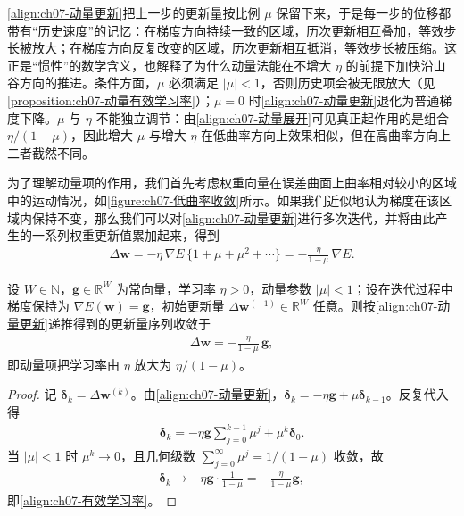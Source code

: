 \documentclass[../../main.tex]{subfiles}
\begin{document}
\begin{remark}
\eqref{align:ch07-动量更新}把上一步的更新量按比例 $\mu$ 保留下来，于是每一步的位移都带有“历史速度”的记忆：在梯度方向持续一致的区域，历次更新相互叠加，等效步长被放大；在梯度方向反复改变的区域，历次更新相互抵消，等效步长被压缩。这正是“惯性”的数学含义，也解释了为什么动量法能在不增大 $\eta$ 的前提下加快沿山谷方向的推进。条件方面，$\mu$ 必须满足 $|\mu|<1$，否则历史项会被无限放大（见\cref{proposition:ch07-动量有效学习率}）；$\mu=0$ 时\eqref{align:ch07-动量更新}退化为普通梯度下降。$\mu$ 与 $\eta$ 不能独立调节：由\eqref{align:ch07-动量展开}可见真正起作用的是组合 $\eta/(1-\mu)$，因此增大 $\mu$ 与增大 $\eta$ 在低曲率方向上效果相似，但在高曲率方向上二者截然不同。
\end{remark}

为了理解动量项的作用，我们首先考虑权重向量在误差曲面上曲率相对较小的区域中的运动情况，如\cref{figure:ch07-低曲率收敛}所示。如果我们近似地认为梯度在该区域内保持不变，那么我们可以对\eqref{align:ch07-动量更新}进行多次迭代，并将由此产生的一系列权重更新值累加起来，得到
\begin{align}
\Delta\mathbf{w} = -\eta\,\nabla E\,\{1+\mu+\mu^{2}+\cdots\} = -\frac{\eta}{1-\mu}\,\nabla E.
\label{align:ch07-动量展开}
\end{align}

\begin{proposition}[动量法的有效学习率]\label{proposition:ch07-动量有效学习率}
设 $W\in\mathbb{N}$，$\mathbf{g}\in\mathbb{R}^{W}$ 为常向量，学习率 $\eta>0$，动量参数 $|\mu|<1$；设在迭代过程中梯度保持为 $\nabla E(\mathbf{w})=\mathbf{g}$，初始更新量 $\Delta\mathbf{w}^{(-1)}\in\mathbb{R}^{W}$ 任意。则按\eqref{align:ch07-动量更新}递推得到的更新量序列收敛于
\begin{align}
\Delta\mathbf{w} = -\frac{\eta}{1-\mu}\,\mathbf{g},
\label{align:ch07-有效学习率}
\end{align}
即动量项把学习率由 $\eta$ 放大为 $\eta/(1-\mu)$。
\end{proposition}
\begin{proof}
记 $\boldsymbol{\delta}_k=\Delta\mathbf{w}^{(k)}$。由\eqref{align:ch07-动量更新}，$\boldsymbol{\delta}_k=-\eta\mathbf{g}+\mu\boldsymbol{\delta}_{k-1}$。反复代入得
\begin{align*}
\boldsymbol{\delta}_k = -\eta\mathbf{g}\sum_{j=0}^{k-1}\mu^{j}+\mu^{k}\boldsymbol{\delta}_0.
\end{align*}
当 $|\mu|<1$ 时 $\mu^{k}\to0$，且几何级数 $\sum_{j=0}^{\infty}\mu^{j}=1/(1-\mu)$ 收敛，故
\begin{align*}
\boldsymbol{\delta}_k \longrightarrow -\eta\mathbf{g}\cdot\frac{1}{1-\mu} = -\frac{\eta}{1-\mu}\mathbf{g},
\end{align*}
即\eqref{align:ch07-有效学习率}。
\end{proof}
\end{document}
